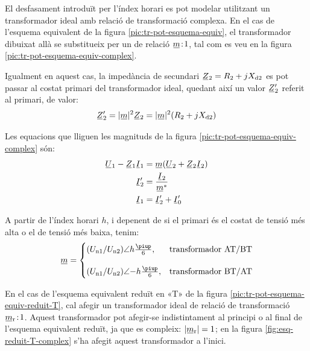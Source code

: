 El desfasament introduït per l'índex horari es pot modelar utilitzant  un transformador ideal amb relació de transformació complexa. En el cas de l'esquema equivalent de la figura  \vref{pic:tr-pot-esquema-equiv}, el transformador  dibuixat allà
se substitueix per un de relació $\cmplx{m}\!:\!1$, tal com es veu en la figura \vref{pic:tr-pot-esquema-equiv-complex}.

\begin{center}
    
    \label{pic:tr-pot-esquema-equiv-complex}
\end{center}

Igualment en aquest cas, la impedància de secundari $\cmplx{Z}_2=R_2 + j X\ped{d2}$ es pot passar al costat primari del transformador ideal, quedant així un valor $\cmplx{Z}_2'$ referit al primari, de valor:
\begin{equation}
    \cmplx{Z}_2' = |\cmplx{m}|^2 \cmplx{Z}_2  = |\cmplx{m}|^2 (R_2 + j X\ped{d2})\label{eq:ZmZ}
\end{equation}

Les equacions que lliguen les magnituds de la figura \vref{pic:tr-pot-esquema-equiv-complex} són:
\begin{subequations}
\begin{align}
    \cmplx{U}_1 - \cmplx{Z}_1 \cmplx{I}_1 &= \cmplx{m} ( \cmplx{U}_2  + \cmplx{Z}_2 \cmplx{I}_2 ) \label{eq:UmZ}\\
    \cmplx{I}'_2 &= \frac{\cmplx{I}_2}{\cmplx{m}^*} \label{eq:ImI}\\
    \cmplx{I}_1  &=   \cmplx{I}_2' + \cmplx{I}_0' \label{eq:III}
\end{align}
\end{subequations}

A partir de l'índex horari $h$, i depenent de si el primari és el costat de tensió més alta o el de tensió més baixa, tenim:
\begin{equation}
\cmplx{m} = \begin{cases}
     (U\ped{n1}/U\ped{n2})\angle h \frac{\piup}{6}, & \text{transformador AT/BT}\\[2.7ex]
     (U\ped{n1}/U\ped{n2})\angle{-h} \frac{\piup}{6}, & \text{transformador BT/AT}
\end{cases}
\label{eq:rel-transf-cmplx}
\end{equation}

En el cas de l'esquema equivalent reduït en «T» de la figura \vref{pic:tr-pot-esquema-equiv-reduit-T}, cal afegir un transformador ideal de relació de transformació  $\cmplx{m}\ped{r}\!:\!1$. Aquest transformador pot afegir-se indistintament  al principi o al final de l'esquema equivalent reduït, ja que es compleix: $|\cmplx{m}\ped{r}|=1$;  en la figura \vref{fig:esq-reduit-T-complex} s'ha afegit aquest transformador a l'inici.


